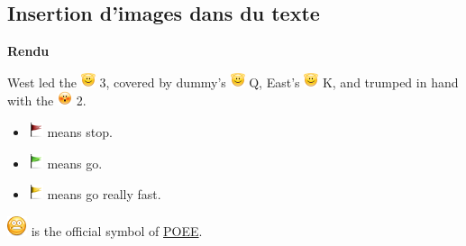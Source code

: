 \documentclass[a4paper,11pt,french]{rtdsphinxmanual}
\begin{document}
\subsection{Insertion d'images dans du texte}
\label{rtd/instruction_base/substitutions:insertion-d-images-dans-du-texte}\begin{tcolorbox}
\begin{minipage}{0.95\linewidth}
\textbf{Rendu}

\medskip


West led the \includegraphics{face-angel.png} 3, covered by dummy's \includegraphics{face-angel.png} Q, East's \includegraphics{face-angel.png} K,
and trumped in hand with the \includegraphics{face-embarrassed.png} 2.
\begin{itemize}
\item {} 
\includegraphics{flag-red.png} means stop.

\item {} 
\includegraphics{flag-green.png} means go.

\item {} 
\includegraphics{flag-yellow.png} means go really fast.

\end{itemize}

\includegraphics{face-worried.png} is the official symbol of \href{http://www.poee.org/}{POEE}.
\end{minipage}
\end{tcolorbox}
\end{document}
